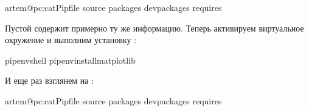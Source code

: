 \documentclass[letterpaper,10pt,russian]{sphinxmanual}
\begin{document}
\begin{sphinxVerbatim}[commandchars=\\\{\}]
artem@pc:\PYGZti{}\PYGZdl{}catPipfile
\PYG{o}{[}\PYG{o}{[}source\PYG{o}{]}\PYG{o}{]}
\PYG{o}{[}packages\PYG{o}{]}
\PYG{o}{[}dev\PYGZhy{}packages\PYG{o}{]}
\PYG{o}{[}requires\PYG{o}{]}
\end{sphinxVerbatim}

\sphinxAtStartPar
Пустой  содержит примерно ту же информацию. Теперь активируем виртуальное окружение и выполним установку :

\begin{sphinxVerbatim}[commandchars=\\\{\}]
pipenvshell
pipenvinstallmatplotlib
\end{sphinxVerbatim}

\sphinxAtStartPar
И еще раз взглянем на :

\begin{sphinxVerbatim}[commandchars=\\\{\}]
artem@pc:\PYGZti{}\PYGZdl{}catPipfile
\PYG{o}{[}\PYG{o}{[}source\PYG{o}{]}\PYG{o}{]}
\PYG{o}{[}packages\PYG{o}{]}
\PYG{o}{[}dev\PYGZhy{}packages\PYG{o}{]}
\PYG{o}{[}requires\PYG{o}{]}
\end{sphinxVerbatim}
\end{document}
